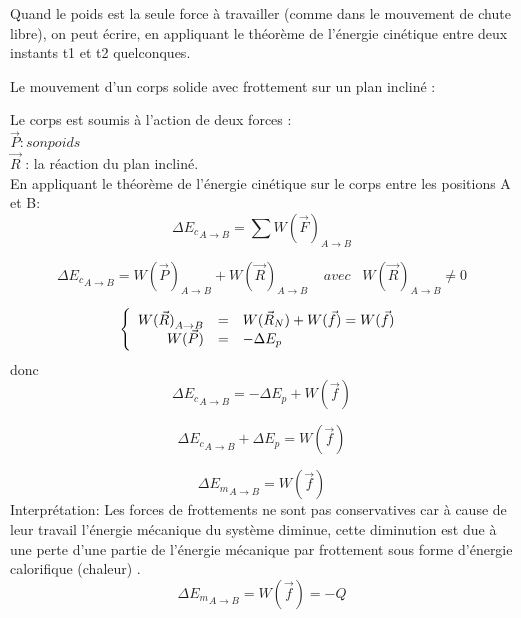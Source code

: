 \documentclass[12pt]{article}
\begin{document}
Quand le poids est la seule force à travailler (comme dans le
mouvement de chute libre), on peut écrire, en appliquant le théorème
de l'énergie cinétique entre deux instants t1 et t2
quelconques.

Le mouvement d'un corps solide avec frottement sur un plan incliné : 

Le corps est soumis à l'action de deux forces :
\\$\vec{P} : son poids$
\\$\vec{R}$ : la réaction du plan incliné.
\\En appliquant le théorème de l'énergie cinétique sur le corps entre les positions A et B:
$$\Delta {E_c}_{A \rightarrow B} =\sum {W(\vec{F})}_{A \rightarrow B}$$

$$\Delta {E_c}_{A \rightarrow B} = {W(\vec{P})}_{A \rightarrow B} + {W(\vec{R})}_{A \rightarrow B} \; \;\;\; avec \; \; \; {W(\vec{R})}_{A \rightarrow B} \ne 0$$

$$
 \left \{
   \begin{array}{r c l}
       {W(\vec{R})}_{A \rightarrow B}  & = & W(\vec{R}_N) + W(\vec{f}) = W(\vec{f}) \\
       W(\vec{P}) & = & -\Delta E_p
   \end{array}
   \right .
$$
donc 
$$ \Delta {E_c}_{A \rightarrow B} = -\Delta E_p  + W(\vec{f})  $$

$$ \Delta {E_c}_{A \rightarrow B}  + \Delta E_p  =  W(\vec{f})  $$


$$ \Delta {E_m}_{A \rightarrow B} = W(\vec{f})  $$
Interprétation: Les forces de frottements ne sont pas conservatives car à cause de leur travail l'énergie mécanique du système diminue, cette
diminution est due à une perte d'une partie de l'énergie mécanique par frottement sous forme d'énergie calorifique (chaleur) .
$$ \Delta {E_m}_{A \rightarrow B} = W(\vec{f}) = -Q$$
\end{document}
